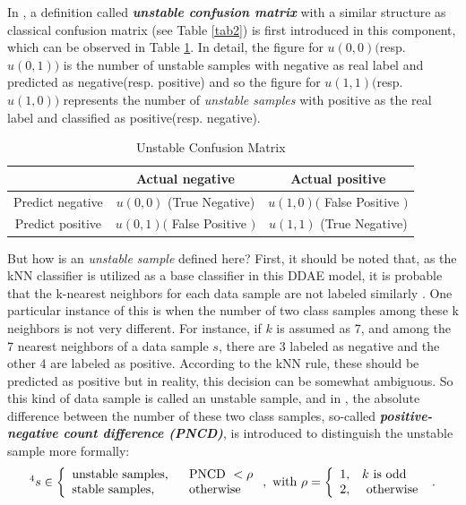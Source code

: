 In \cite{73}, a definition called \textbf{\textit{unstable confusion matrix}} with a similar structure as classical confusion matrix (see Table \ref{tab2}) is first introduced in this component, which can be observed in Table \ref{tab4}. In detail, the figure for $u(0,0)($resp. $u(0,1))$ is the number of unstable samples with negative as real label and predicted as negative(resp. positive) and so the figure for $u(1,1)($resp. $u(1,0))$ represents the number of \textit{unstable samples} with positive as the real label and classified as positive(resp. negative).
\begin{table}[h]
    \centering
    \begin{tabular}{|c|c|c|}
    \hline
                     & Actual negative              & Actual positive              \\ \hline
    Predict negative & $u(0,0)$ (True Negative)     & $u(1,0)($ False Positive $)$ \\ \hline
    Predict positive & $u(0,1)($ False Positive $)$ & $u(1,1)$ (True Negative)     \\ \hline
    \end{tabular}
    \caption{Unstable Confusion Matrix}
    \label{tab4}
\end{table}

But how is an \textit{unstable sample} defined here? First, it should be noted that, as the kNN classifier is utilized as a base classifier in this DDAE model, it is probable that the k-nearest neighbors for each data sample are not labeled similarly \cite{73}. One particular instance of this is when the number of two class samples among these k neighbors is not very different. For instance, if $k$ is assumed as 7, and among the 7 nearest neighbors of a data sample $s$, there are 3 labeled as negative and the other 4 are labeled as positive. According to the kNN rule, these should be predicted as positive but in reality, this decision can be somewhat ambiguous. So this kind of data sample is called an unstable sample, and in \cite{73}, the absolute difference between the number of these two class samples, so-called \textbf{\textit{positive-negative count difference (PNCD)}}, is introduced to distinguish the unstable sample more formally:
\begin{equation}\label{eq6}\footnotemark[4]
    s \in\left\{\begin{array}{ll}
    \text {unstable samples, } & \text { PNCD }<\rho \\
    \text {stable samples, } & \text { otherwise }
    \end{array}\right., \text{ with }\rho=\left\{\begin{array}{ll}
        1, & k \text { is odd } \\
        2, & \text { otherwise }
        \end{array}\right..
\end{equation}

